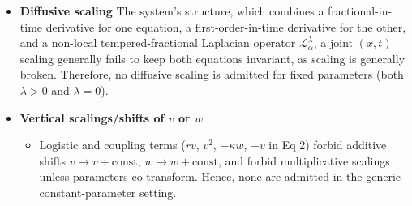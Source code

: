 \documentclass{article}
\begin{document}
\begin{itemize}
\begin{equation*}
\mathfrak g=\langle X_2=\partial_t,\; X_1=\partial_x,\; X_3=x_j\partial_{x_k} - x_k\partial_{x_j}\rangle,
\end{equation*}
where $i = 1,\ldots ,n$ and $j,k$ range over spatial indices with $j < k$.
\item[\textbf{(c)}] \textbf{Diffusive scaling}
The system's structure, which combines a fractional-in-time derivative for one equation, a first-order-in-time derivative for the other, and a non-local tempered-fractional Laplacian operator $\mathcal{L}_\alpha^\lambda$, a joint $(x,t)$ scaling generally fails to keep both equations invariant, as scaling is generally broken. Therefore, no diffusive scaling is admitted for fixed parameters (both $\lambda>0$ and $\lambda=0$).
\item[\textbf{(d)}] \textbf{Vertical scalings/shifts of $v$ or $w$}
\begin{itemize}
\item[$\bullet$]
Logistic and coupling terms ($rv$, $v^2$, $-\kappa w$, $+v$ in Eq 2) forbid additive shifts $v\mapsto v+\text{const}$, $w\mapsto w+\text{const}$, and forbid multiplicative scalings unless parameters co-transform. Hence, none are admitted in the generic constant-parameter setting.
\end{itemize}
\end{itemize}
\end{document}
